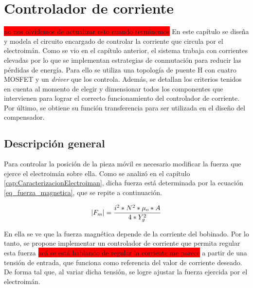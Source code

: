 \chapter{Controlador de corriente}  \label{cap:ControladorCorriente}
\colorbox{red}{no nos olvidemos de actualizar esto cuando terminemos}
En este capítulo se diseña y modela el circuito encargado de controlar la corriente que circula por el electroimán. Como se vio en el capítulo anterior, el sistema trabaja con corrientes elevadas por lo que se implementan estrategias de conmutación para reducir las pérdidas de energía. Para ello se utiliza una topología de puente H con cuatro MOSFET y un \textsl{driver} que los controla. Además, se detallan los criterios tenidos en cuenta al momento de  elegir  y dimensionar todos los componentes que intervienen para lograr el correcto funcionamiento del controlador de corriente. Por último, se obtiene su función transferencia  para ser utilizada en el diseño del compensador.

\section{Descripción general}\label{sec_descripcion-general}

Para controlar la posición de la pieza móvil es necesario modificar la fuerza que ejerce el electroimán sobre ella. Como se analizó en el capítulo \ref{cap:CaracterizacionElectroiman}, dicha fuerza está determinada por la ecuación \ref{eq_fuerza_magnetica}, que se repite a continuación. 

\begin{equation*}
	\lvert F_{m}\rvert=\frac{i^{2}*N^{2}*\mu_{o}*A}{4*Y_{g}^{2}}
\end{equation*}

En ella se ve que la fuerza magnética depende de la corriente del bobinado. Por lo tanto, se propone implementar un controlador de corriente que permita regular esta fuerza \colorbox{red}{acá se está hablando de regular la corriente me parece} a partir de una tensión de entrada, que funciona como referencia del valor de corriente deseado. De forma tal que, al variar dicha tensión, se logre ajustar la fuerza ejercida por el electroimán.


